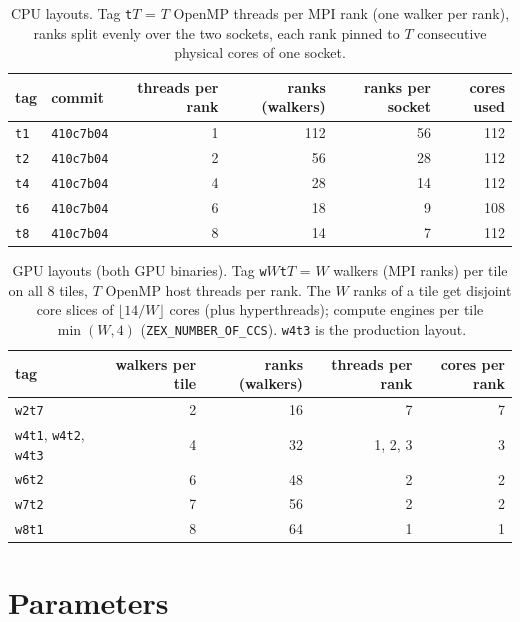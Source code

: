 \documentclass[11pt,a4paper]{article}
\begin{document}
\begin{table}[H]\centering\small
\caption{CPU layouts. Tag \texttt{t}$T$ = $T$ OpenMP threads per MPI rank (one walker per rank), ranks split evenly over
the two sockets, each rank pinned to $T$ consecutive physical cores of one socket.}
\begin{tabular}{@{}llrrrr@{}}\toprule
tag & commit & threads per rank & ranks (walkers) & ranks per socket & cores used\\\midrule
\texttt{t1} & \texttt{410c7b04} & 1 & 112 & 56 & 112\\
\texttt{t2} & \texttt{410c7b04} & 2 & 56 & 28 & 112\\
\texttt{t4} & \texttt{410c7b04} & 4 & 28 & 14 & 112\\
\texttt{t6} & \texttt{410c7b04} & 6 & 18 & 9 & 108\\
\texttt{t8} & \texttt{410c7b04} & 8 & 14 & 7 & 112\\\bottomrule
\end{tabular}\end{table}

\begin{table}[H]\centering\small
\caption{GPU layouts (both GPU binaries). Tag \texttt{w}$W$\texttt{t}$T$ = $W$ walkers (MPI ranks) per tile on all 8 tiles,
$T$ OpenMP host threads per rank. The $W$ ranks of a tile get disjoint core slices of $\lfloor14/W\rfloor$ cores (plus hyperthreads); compute engines per tile
$\min(W,4)$ (\texttt{ZEX\_NUMBER\_OF\_CCS}). \texttt{w4t3} is the production layout.}
\begin{tabular}{@{}lrrrr@{}}\toprule
tag & walkers per tile & ranks (walkers) & threads per rank & cores per rank\\\midrule
\texttt{w2t7} & 2 & 16 & 7 & 7\\
\texttt{w4t1}, \texttt{w4t2}, \texttt{w4t3} & 4 & 32 & 1, 2, 3 & 3\\
\texttt{w6t2} & 6 & 48 & 2 & 2\\
\texttt{w7t2} & 7 & 56 & 2 & 2\\
\texttt{w8t1} & 8 & 64 & 1 & 1\\\bottomrule
\end{tabular}\end{table}

\section{Parameters}
\end{document}
